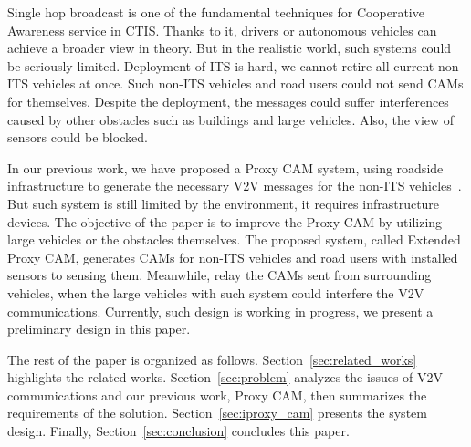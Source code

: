 Single hop broadcast is one of the fundamental techniques for Cooperative Awareness service in CTIS.
Thanks to it, drivers or autonomous vehicles can achieve a broader view in theory.
But in the realistic world, such systems could be seriously limited.
Deployment of ITS is hard, we cannot retire all current non-ITS vehicles at once.
Such non-ITS vehicles and road users could not send CAMs for themselves.
Despite the deployment, the messages could suffer interferences caused by other obstacles such as buildings and large vehicles.
Also, the view of sensors could be blocked.

In our previous work, we have proposed a Proxy CAM system,
using roadside infrastructure to generate the necessary V2V messages for the non-ITS vehicles~\cite{kitazato2016proxy}.
But such system is still limited by the environment, it requires infrastructure devices.
The objective of the paper is to improve the Proxy CAM by utilizing large vehicles or the obstacles themselves.
The proposed system, called Extended Proxy CAM,
generates CAMs for non-ITS vehicles and road users with installed sensors to sensing them.
Meanwhile, relay the CAMs sent from surrounding vehicles, when the large vehicles with such system could interfere the V2V communications.
Currently, such design is working in progress, we present a preliminary design in this paper.

The rest of the paper is organized as follows.
Section~\ref{sec:related_works} highlights the related works.
Section~\ref{sec:problem} analyzes the issues of V2V communications and our previous work, Proxy CAM,
then summarizes the requirements of the solution.
Section~\ref{sec:iproxy_cam} presents the system design.
Finally, Section~\ref{sec:conclusion} concludes this paper.